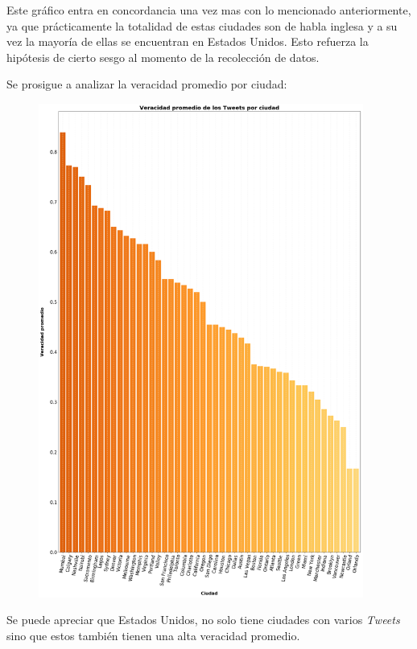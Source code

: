 \documentclass[titlepage,a4paper]{article}
\begin{document}
    Este gráfico entra en concordancia una vez mas con lo mencionado anteriormente, ya que prácticamente la totalidad de estas ciudades son de habla inglesa y a su vez la mayoría de ellas se encuentran en Estados Unidos. Esto refuerza la hipótesis de cierto sesgo al momento de la recolección de datos. 
    
    Se prosigue a analizar la veracidad promedio por ciudad:
    
    \begin{figure}[H]
    \centering
    \includegraphics[width=0.95\textwidth]{graficos/Analisis de Locacion/veracidad_promedio_de_los_tweets_por_ciudad.png}
    \caption{}
    \end{figure}
    
    Se puede apreciar que Estados Unidos, no solo tiene ciudades con varios \textit{Tweets} sino que estos también tienen una alta veracidad promedio.
    
\end{document}
